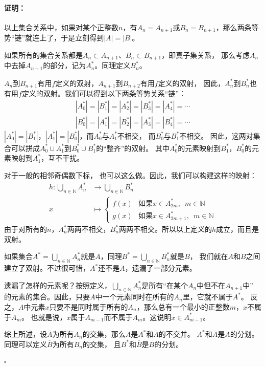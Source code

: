 \documentclass[12pt,UTF8]{ctexbook}
\theoremstyle{definition}
\theoremstyle{plain}
\renewenvironment{proof}{\paragraph{\textbf{证明：}}}{\hfill$\square$}
\begin{document}
\begin{appendix}
\begin{proof}
    以上集合关系中，如果对某个正整数$n$，有$A_n = A_{n+1}$或$B_n = B_{n+1}$，那么两条等势“链”就连上了，于是立刻得到$|A| = |B|$。

    如果所有的集合关系都是$A_n \subset A_{n+1}$、$B_n \subset B_{n+1}$，即真子集关系，
    那么考虑$A_n$中去掉$A_{n+1}$的部分，记为$A_n^*$。同理定义$B_n^*$。
    
    $A_n$到$B_{n+1}$有用$f$定义的双射，$A_{n+1}$到$B_{n+2}$有用$f$定义的双射，
    因此，$A_n^*$到$B_n^*$也有用$f$定义的双射。我们可以得到以下两条等势关系“链”：
    \begin{align*}
        |A_0^*| = |B_1^*| = |A_2^*| = |B_3^*| = |A_4^*| = \cdots  \\
        |B_0^*| = |A_1^*| = |B_2^*| = |A_3^*| = |B_4^*| = \cdots   
    \end{align*}
    $|A_0^*| = |B_1^*|$，$|A_1^*| = |B_0^*|$，而$A_0^*$与$A_1^*$不相交，
    而$B_0^*$与$B_1^*$不相交。
    因此，这两对集合可以拼成$A_0^* \cup A_1^*$到$B_0^* \cup B_1^*$的“整齐”的双射。
    其中$A_0^*$的元素映射到$B_1^*$，$B_0^*$的元素映射到$A_1^*$，互不干扰。
    
    对于一般的相邻奇偶数下标，
    也可以这么做。因此，我们可以构建这样的映射：
    \begin{align*}
        h : \bigcup_{n\in\mathbb{N}} A_n^* &\rightarrow \bigcup_{n\in\mathbb{N}} B_n^*  \\
        x \quad&\mapsto \left\{ \begin{array}{ll}
            f(x) & \mbox{如果} x\in A_{2m}^*,\,\,\, m\in\mathbb{N}  \\
            g(x) & \mbox{如果} x\in A_{2m+1}^*,\,\,\, m\in\mathbb{N} 
        \end{array} \right.
    \end{align*}
    由于对所有的$n$，$A_n^*$两两不相交，$B_n^*$两两不相交。所以以上定义的$h$成立，而且是双射。

    如果集合$A^* = \bigcup_{n\in\mathbb{N}} A_n^*$就是$A$，同理$B^* = \bigcup_{n\in\mathbb{N}} B_n^*$就是$B$，
    我们就在$A$和$B$之间建立了双射。不过很可惜，$A^*$还不是$A$，遗漏了一部分元素。

    遗漏了怎样的元素呢？按照定义，$\bigcup_{n\in\mathbb{N}} A_n^*$是所有“在某个$A_n$中但不在$A_{n+1}$中”
    的元素的集合。因此，只要$A$中一个元素同时在所有的$A_n$里，它就不属于$A^*$。
    反之，$A$中元素$x$只要不是同时属于所有的$A_n$，那么总有一个最小的正整数$m$，$x$不属于$A_m$。
    也就是说，$x$属于$A_{m-1}$而不属于$A_m$。这说明$x\in A_{m-1}^*$。

    综上所述，设$\overline{A}$为所有$A_n$的交集，那么$A$是$A^*$和$\overline{A}$的不交并。
    $A^*$和$\overline{A}$是$A$的分划。同理可以定义$\overline{B}$为所有$B_n$的交集，
    且$B^*$和$\overline{B}$是$B$的分划。


\end{proof}
\end{appendix}
\end{document}
